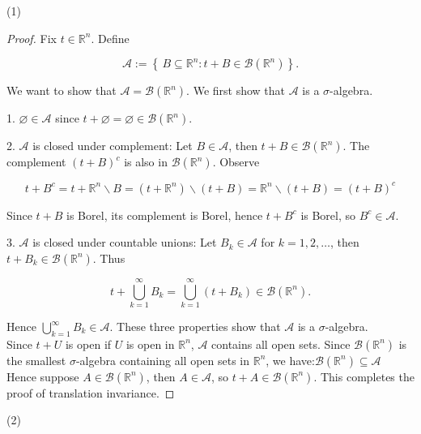 (1)

\begin{proof}

Fix \(t \in \mathbb{R}^{n}\). Define

\[\mathcal{A} := \left\{ {\, B \subseteq \mathbb{R}^{n}:t + B \in \mathcal{B}(\mathbb{R}^{n})} \right\}.\]

We want to show that \(\mathcal{A} = \mathcal{B}(\mathbb{R}^{n})\). We first show that \(\mathcal{A}\) is a \(\sigma\)-algebra.

1. \(\varnothing \in \mathcal{A}\) since \(t + \varnothing = \varnothing \in \mathcal{B}(\mathbb{R}^{n})\).

2. \(\mathcal{A}\) is closed under complement: Let \(B \in \mathcal{A}\), then \(t + B \in \mathcal{B}(\mathbb{R}^{n})\). The complement \((t + B)^{c}\) is also in \(\mathcal{B}(\mathbb{R}^{n})\). Observe

\[t + B^{c} = t + \mathbb{R}^{n}\backslash B = (t + \mathbb{R}^{n})\backslash(t + B) = \mathbb{R}^{n}\backslash(t + B) = (t + B)^{c}\]

Since \(t + B\) is Borel, its complement is Borel, hence \(t + B^{c}\) is Borel, so \(B^{c} \in \mathcal{A}\).

3. \(\mathcal{A}\) is closed under countable unions: Let \(B_{k} \in \mathcal{A}\) for \(k = 1,2,\ldots\), then \(t + B_{k} \in \mathcal{B}(\mathbb{R}^{n})\). Thus

\[t + \bigcup\limits_{k = 1}^{\infty}B_{k} = \bigcup\limits_{k = 1}^{\infty}(t + B_{k}) \in \mathcal{B}(\mathbb{R}^{n}).\]

Hence \(\bigcup_{k = 1}^{\infty}B_{k} \in \mathcal{A}\). These three properties show that \(\mathcal{A}\) is a \(\sigma\)-algebra.\\
Since \(t + U\) is open if \(U\) is open in \(\mathbb{R}^{n}\), \(\mathcal{A}\) contains all open sets. Since \(\mathcal{B}(\mathbb{R}^{n})\) is the smallest \(\sigma\)-algebra containing all open sets in \(\mathbb{R}^{n}\), we have:\(\mathcal{B}(\mathbb{R}^{n}) \subseteq \mathcal{A}\) Hence suppose \(A \in \mathcal{B}(\mathbb{R}^{n})\), then \(A \in \mathcal{A}\), so \(t + A \in \mathcal{B}(\mathbb{R}^{n})\). This completes the proof of translation invariance.

\end{proof}

(2)

